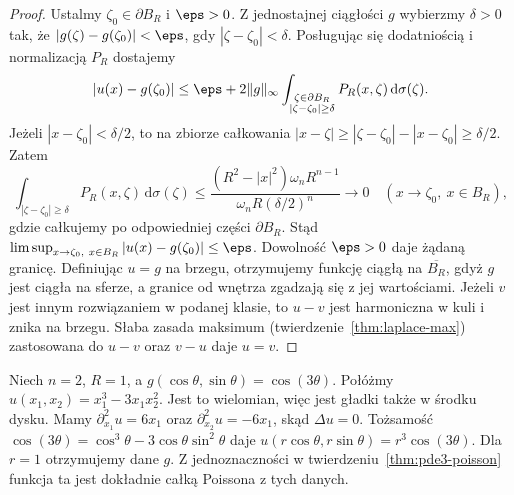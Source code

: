 \begin{proof}
Ustalmy $\zeta_0\in\partial B_R$ i $\eps>0$.
Z jednostajnej ciągłości $g$ wybierzmy $\delta>0$
tak, że $|g(\zeta)-g(\zeta_0)|<\eps$, gdy
$|\zeta-\zeta_0|<\delta$. Posługując się dodatniością
i normalizacją $P_R$ dostajemy
\[
 |u(x)-g(\zeta_0)|\leq\eps+
 2\|g\|_\infty
 \int_{\substack{\zeta\in\partial B_R\\
 |\zeta-\zeta_0|\geq\delta}}P_R(x,\zeta)\,
 \mathrm d\sigma(\zeta).
\]
Jeżeli $|x-\zeta_0|<\delta/2$, to na zbiorze
całkowania $|x-\zeta|\geq|\zeta-\zeta_0|
-|x-\zeta_0|\geq\delta/2$.
Zatem
\[
 \int_{|\zeta-\zeta_0|\geq\delta}P_R(x,\zeta)\,
 \mathrm d\sigma(\zeta)
 \leq \frac{(R^2-|x|^2)\omega_n R^{n-1}}
 {\omega_n R(\delta/2)^n}\longrightarrow0
 \quad(x\to\zeta_0,\ x\in B_R),
\]
gdzie całkujemy po odpowiedniej części $\partial B_R$.
Stąd $\limsup_{x\to\zeta_0,\ x\in B_R}
|u(x)-g(\zeta_0)|\leq\eps$. Dowolność $\eps>0$
daje żądaną granicę. Definiując $u=g$ na brzegu,
otrzymujemy funkcję ciągłą na $\overline{B_R}$,
gdyż $g$ jest ciągła na sferze, a granice od wnętrza
zgadzają się z jej wartościami.
Jeżeli $v$ jest innym rozwiązaniem w podanej klasie,
to $u-v$ jest harmoniczna w kuli i znika na brzegu.
Słaba zasada maksimum (twierdzenie~\ref{thm:laplace-max})
zastosowana do $u-v$ oraz $v-u$ daje $u=v$.
\end{proof}

\begin{przyklad}
Niech $n=2$, $R=1$, a $g(\cos\theta,\sin\theta)=\cos(3\theta)$.
Połóżmy $u(x_1,x_2)=x_1^3-3x_1x_2^2$.
Jest to wielomian, więc jest gładki także w środku dysku.
Mamy $\partial_{x_1}^2u=6x_1$ oraz
$\partial_{x_2}^2u=-6x_1$, skąd $\Delta u=0$.
Tożsamość $\cos(3\theta)=\cos^3\theta
-3\cos\theta\sin^2\theta$ daje
$u(r\cos\theta,r\sin\theta)=r^3\cos(3\theta)$.
Dla $r=1$ otrzymujemy dane $g$.
Z jednoznaczności w twierdzeniu~\ref{thm:pde3-poisson}
funkcja ta jest dokładnie całką Poissona z tych danych.
\end{przyklad}

